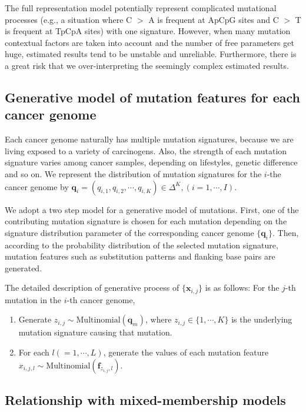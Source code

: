 The full representation model potentially represent complicated mutational processes
(e.g., a situation where C $>$ A is frequent at ApCpG sites and C $>$ T is frequent at TpCpA sites) with one signature.
However, when many mutation contextual factors are taken into account and the number of free parameters get huge,
estimated results tend to be unstable and unreliable.
Furthermore, there is a great risk that we over-interpreting the seemingly complex estimated results.


\subsection*{Generative model of mutation features for each cancer genome}

Each cancer genome naturally has multiple mutation signatures,
because we are living exposed to a variety of carcinogens. 
Also, the strength of each mutation signature varies among cancer samples, 
depending on lifestyles, genetic difference and so on.
We represent the distribution of mutation signatures for the $i$-the cancer genome 
by $\bm{q}_i = (q_{i,1}, q_{i,2}, \cdots, q_{i, K}) \in \Delta^K,  (i = 1, \cdots, I)$.

We adopt a two step model for a generative model of mutations.
First, one of the contributing mutation signature is chosen for each mutation 
depending on the signature distribution parameter of the corresponding cancer genome $\{ \bm{q}_i \}$.
Then, according to the probability distribution of the selected mutation signature, 
mutation features such as substitution patterns and flanking base pairs are generated.

The detailed description of generative process of $\{ \bm{x}_{i,j} \}$ is as follows:
For the $j$-th mutation in the $i$-th cancer genome, 
\begin{enumerate}
\item
Generate $z_{i,j} \sim \text{Multinomial} (\bm{q}_m)$, where $z_{i,j} \in \{1,\cdots,K \}$ is the underlying mutation signature causing that mutation.
\item 
For each $l (= 1, \cdots, L)$, generate the values of each mutation feature $x_{i,j,l} \sim \text{Multinomial}(\bm{f}_{z_{i,j},l})$.
\end{enumerate}




\subsection*{Relationship with mixed-membership models}

